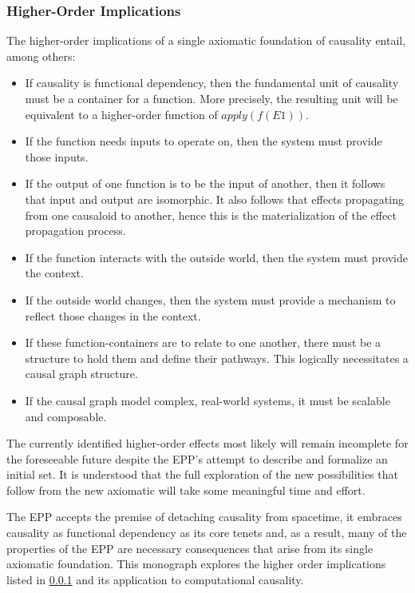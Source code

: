 \subsubsection{Higher-Order Implications}
\label{sub:epp_higher_order_implications}


The higher-order implications of a single axiomatic foundation of causality entail, among others:

\begin{itemize}
	\item If causality is functional dependency, then the fundamental unit of causality must be a container for a function. More precisely, the resulting unit will be equivalent to a higher-order function of $apply(f(E1))$.
	\item If the function needs inputs to operate on, then the system must provide those inputs.  
	\item If the output of one function is to be the input of another, then it follows that input and output are isomorphic. It also follows that effects propagating from one causaloid to another, hence this is the materialization of the effect propagation process. 
	\item If the function interacts with the outside world, then the system must provide the context. 
	\item If the outside world changes, then the system must provide a mechanism to reflect those changes in the context. 
	\item If these function-containers are to relate to one another, there must be a structure to hold them and define their pathways. This logically necessitates a causal graph structure.
	\item If the causal graph model complex, real-world systems, it must be scalable and composable. 
\end{itemize}

The currently identified higher-order effects most likely will remain incomplete for the foreseeable future despite the EPP's attempt to describe and formalize an initial set. It is understood that the full exploration of the new possibilities that follow from the new axiomatic will take some meaningful time and effort. 

The EPP accepts the premise of detaching causality from spacetime, it embraces causality as functional dependency as its core tenets and, as a result, many of the properties of the EPP are necessary consequences that arise from its single axiomatic foundation. This monograph explores the higher order implications listed in \ref{sub:epp_higher_order_implications} and its application to computational causality. 
% 
%
